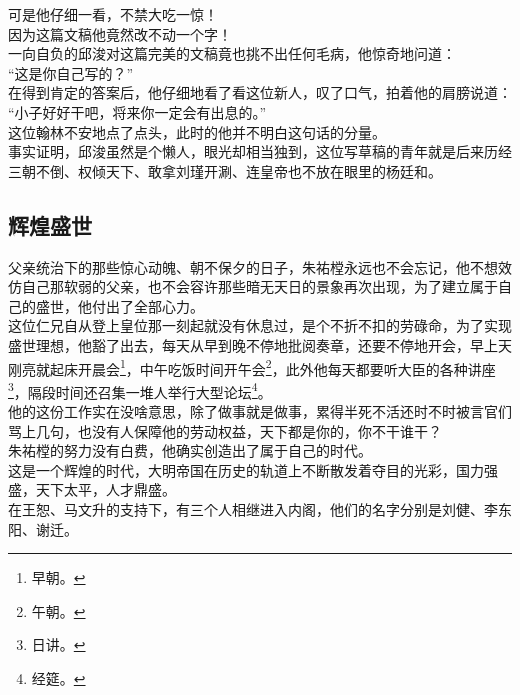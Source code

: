 \begin{multicols}{\theparacolNo}
可是他仔细一看，不禁大吃一惊！\\

因为这篇文稿他竟然改不动一个字！\\

一向自负的邱浚对这篇完美的文稿竟也挑不出任何毛病，他惊奇地问道：\\

“这是你自己写的？”\\

在得到肯定的答案后，他仔细地看了看这位新人，叹了口气，拍着他的肩膀说道：\\

“小子好好干吧，将来你一定会有出息的。”\\

这位翰林不安地点了点头，此时的他并不明白这句话的分量。\\

事实证明，邱浚虽然是个懒人，眼光却相当独到，这位写草稿的青年就是后来历经三朝不倒、权倾天下、敢拿刘瑾开涮、连皇帝也不放在眼里的杨廷和。\\

\subsection{辉煌盛世}
父亲统治下的那些惊心动魄、朝不保夕的日子，朱祐樘永远也不会忘记，他不想效仿自己那软弱的父亲，也不会容许那些暗无天日的景象再次出现，为了建立属于自己的盛世，他付出了全部心力。\\

这位仁兄自从登上皇位那一刻起就没有休息过，是个不折不扣的劳碌命，为了实现盛世理想，他豁了出去，每天从早到晚不停地批阅奏章，还要不停地开会，早上天刚亮就起床开晨会\footnote{早朝。}，中午吃饭时间开午会\footnote{午朝。}，此外他每天都要听大臣的各种讲座\footnote{日讲。}，隔段时间还召集一堆人举行大型论坛\footnote{经筵。}。\\

他的这份工作实在没啥意思，除了做事就是做事，累得半死不活还时不时被言官们骂上几句，也没有人保障他的劳动权益，天下都是你的，你不干谁干？\\

朱祐樘的努力没有白费，他确实创造出了属于自己的时代。\\

这是一个辉煌的时代，大明帝国在历史的轨道上不断散发着夺目的光彩，国力强盛，天下太平，人才鼎盛。\\

在王恕、马文升的支持下，有三个人相继进入内阁，他们的名字分别是刘健、李东阳、谢迁。\\


\end{multicols}
